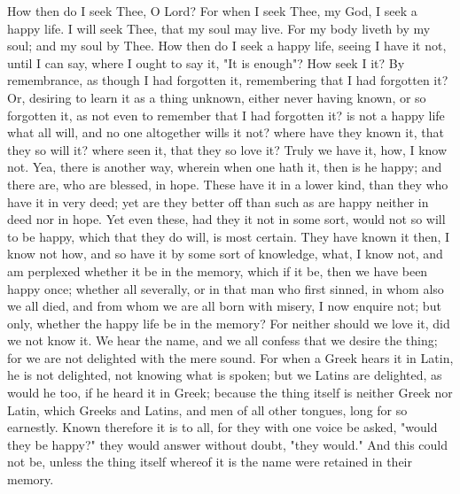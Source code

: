 \documentclass[b5paper,openright,12pt,twoside]{book}
\begin{document}
How then do I seek Thee, O Lord? For when I seek Thee, my God, I seek a
happy life. I will seek Thee, that my soul may live. For my body liveth
by my soul; and my soul by Thee. How then do I seek a happy life, seeing
I have it not, until I can say, where I ought to say it, "It is enough"?
How seek I it? By remembrance, as though I had forgotten it, remembering
that I had forgotten it? Or, desiring to learn it as a thing unknown,
either never having known, or so forgotten it, as not even to remember
that I had forgotten it? is not a happy life what all will, and no one
altogether wills it not? where have they known it, that they so will it?
where seen it, that they so love it? Truly we have it, how, I know not.
Yea, there is another way, wherein when one hath it, then is he happy;
and there are, who are blessed, in hope. These have it in a lower kind,
than they who have it in very deed; yet are they better off than such as
are happy neither in deed nor in hope. Yet even these, had they it not
in some sort, would not so will to be happy, which that they do will, is
most certain. They have known it then, I know not how, and so have it by
some sort of knowledge, what, I know not, and am perplexed whether it be
in the memory, which if it be, then we have been happy once; whether all
severally, or in that man who first sinned, in whom also we all died,
and from whom we are all born with misery, I now enquire not; but only,
whether the happy life be in the memory? For neither should we love it,
did we not know it. We hear the name, and we all confess that we desire
the thing; for we are not delighted with the mere sound. For when
a Greek hears it in Latin, he is not delighted, not knowing what is
spoken; but we Latins are delighted, as would he too, if he heard it in
Greek; because the thing itself is neither Greek nor Latin, which Greeks
and Latins, and men of all other tongues, long for so earnestly. Known
therefore it is to all, for they with one voice be asked, "would they
be happy?" they would answer without doubt, "they would." And this could
not be, unless the thing itself whereof it is the name were retained in
their memory.
\end{document}
